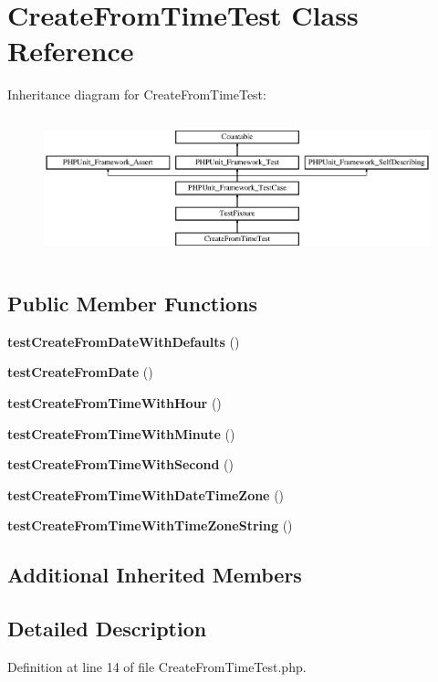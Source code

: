 \section{Create\+From\+Time\+Test Class Reference}
\label{class_create_from_time_test}
Inheritance diagram for Create\+From\+Time\+Test\+:\begin{figure}[H]
\begin{center}
\leavevmode
\includegraphics[height=4.129793cm]{class_create_from_time_test}
\end{center}
\end{figure}
\subsection*{Public Member Functions}
\begin{DoxyCompactItemize}
\item 
{\bf test\+Create\+From\+Date\+With\+Defaults} ()
\item 
{\bf test\+Create\+From\+Date} ()
\item 
{\bf test\+Create\+From\+Time\+With\+Hour} ()
\item 
{\bf test\+Create\+From\+Time\+With\+Minute} ()
\item 
{\bf test\+Create\+From\+Time\+With\+Second} ()
\item 
{\bf test\+Create\+From\+Time\+With\+Date\+Time\+Zone} ()
\item 
{\bf test\+Create\+From\+Time\+With\+Time\+Zone\+String} ()
\end{DoxyCompactItemize}
\subsection*{Additional Inherited Members}


\subsection{Detailed Description}


Definition at line 14 of file Create\+From\+Time\+Test.\+php.



